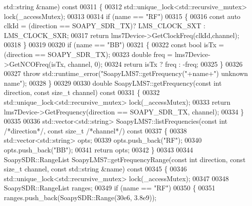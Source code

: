 \begin{DoxyCode}
{{{{{{{{{{{      std::string &name)\textcolor{keyword}{ const}
00311 \textcolor{keyword}{}\{
00312     std::unique\_lock<std::recursive\_mutex> lock(_accessMutex);
00313 
00314     \textcolor{keywordflow}{if} (name == \textcolor{stringliteral}{"RF"})
00315     \{
00316         \textcolor{keyword}{const} \textcolor{keyword}{auto} clkId = (direction == SOAPY_SDR_TX)? LMS_CLOCK_SXT : 
      LMS_CLOCK_SXR;
00317         \textcolor{keywordflow}{return} lms7Device->GetClockFreq(clkId,channel);
00318     \}
00319 
00320     \textcolor{keywordflow}{if} (name == \textcolor{stringliteral}{"BB"})
00321     \{
00322         \textcolor{keyword}{const} \textcolor{keywordtype}{bool} isTx = (direction == SOAPY_SDR_TX);
00323         \textcolor{keywordtype}{double} freq = lms7Device->GetNCOFreq(isTx, channel, 0);
00324         \textcolor{keywordflow}{return} isTx ? freq : -freq;
00325     \}
00326 
00327     \textcolor{keywordflow}{throw} std::runtime\_error(\textcolor{stringliteral}{"SoapyLMS7::getFrequency("}+name+\textcolor{stringliteral}{") unknown name"});
00328 \}
00329 
00330 \textcolor{keywordtype}{double} SoapyLMS7::getFrequency(\textcolor{keyword}{const} \textcolor{keywordtype}{int} direction, \textcolor{keyword}{const} \textcolor{keywordtype}{size\_t} channel)\textcolor{keyword}{ const}
00331 \textcolor{keyword}{}\{
00332     std::unique\_lock<std::recursive\_mutex> lock(_accessMutex);
00333     \textcolor{keywordflow}{return} lms7Device->GetFrequency(direction == SOAPY_SDR_TX, channel);
00334 \}
00335 
00336 std::vector<std::string> SoapyLMS7::listFrequencies(\textcolor{keyword}{const} \textcolor{keywordtype}{int} \textcolor{comment}{/*direction*/}, \textcolor{keyword}{const} \textcolor{keywordtype}{size\_t} \textcolor{comment}{/*channel*/})\textcolor{keyword}{
       const}
00337 \textcolor{keyword}{}\{
00338     std::vector<std::string> opts;
00339     opts.push\_back(\textcolor{stringliteral}{"RF"});
00340     opts.push\_back(\textcolor{stringliteral}{"BB"});
00341     \textcolor{keywordflow}{return} opts;
00342 \}
00343 
00344 SoapySDR::RangeList SoapyLMS7::getFrequencyRange(\textcolor{keyword}{const} \textcolor{keywordtype}{int} direction, \textcolor{keyword}{const} \textcolor{keywordtype}{size\_t} channel, \textcolor{keyword}{const} 
      std::string &name)\textcolor{keyword}{ const}
00345 \textcolor{keyword}{}\{
00346     std::unique\_lock<std::recursive\_mutex> lock(_accessMutex);
00347 
00348     SoapySDR::RangeList ranges;
00349     \textcolor{keywordflow}{if} (name == \textcolor{stringliteral}{"RF"})
00350     \{
00351         ranges.push\_back(SoapySDR::Range(30e6, 3.8e9));
}}}}}}}}}}}
\end{DoxyCode}
